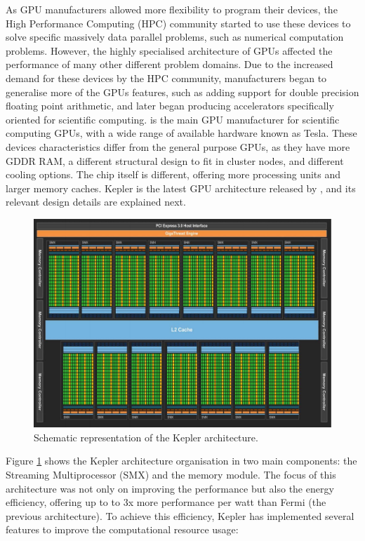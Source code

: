 As GPU manufacturers allowed more flexibility to program their devices, the High Performance Computing (HPC) community started to use these devices to solve specific massively data parallel problems, such as numerical computation problems. However, the highly specialised architecture of GPUs affected the performance of many other different problem domains. Due to the increased demand for these devices by the HPC community, manufacturers began to generalise more of the GPUs features, such as adding support for double precision floating point arithmetic, and later began producing accelerators specifically oriented for scientific computing. \nvidia is the main GPU manufacturer for scientific computing GPUs, with a wide range of available hardware known as Tesla. These devices characteristics differ from the general purpose GPUs, as they have more GDDR RAM, a different structural design to fit in cluster nodes, and different cooling options. The chip itself is different, offering more processing units and larger memory caches. Kepler \cite{NVIDIA:Kepler} is the latest GPU architecture released by \nvidia, and its relevant design details are explained next.

\begin{figure}[!htp]
	\begin{center}
		\includegraphics[scale=0.45]{imgs/kepler_arch.png}
		\caption{Schematic representation of the \nvidia Kepler architecture.}
		\label{fig:kepler}
	\end{center}
\end{figure}

Figure \ref{fig:kepler} shows the Kepler architecture organisation in two main components: the Streaming Multiprocessor (SMX) and the memory module. The focus of this architecture was not only on improving the performance but also the energy efficiency, offering up to to 3x more performance per watt than Fermi (the previous architecture). To achieve this efficiency, Kepler has implemented several features to improve the computational resource usage:

